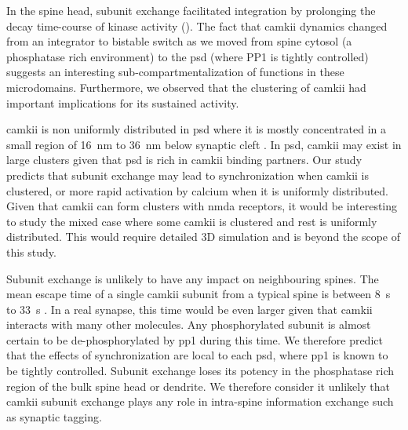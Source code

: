 \documentclass[9pt,lineno,doublespacing]{elife}
\begin{document}
In the spine head, subunit exchange facilitated integration by prolonging the
decay time-course of kinase activity ().  The
fact that \gls{camkii} dynamics changed from an integrator to bistable switch as
we moved from spine cytosol (a phosphatase rich environment) to the \gls{psd}
(where PP1 is tightly controlled) suggests an interesting
sub-compartmentalization of functions in these microdomains. Furthermore, we
observed that the clustering of \gls{camkii} had important implications for its
sustained activity.

\Gls{camkii} is non uniformly distributed in \gls{psd} where it is mostly
concentrated in a small region of \SI{16}{\nano \meter} to \SI{36}{\nano \meter}
below synaptic cleft \citep{petersen_distribution_2003}. In \gls{psd}, \gls{camkii} may exist in
large clusters given that \gls{psd} is rich in \gls{camkii} binding partners.
Our study predicts that subunit exchange may lead to synchronization when
\gls{camkii} is clustered, or more rapid activation by calcium when it is uniformly
distributed. Given that \gls{camkii} can form clusters with \gls{nmda}
receptors, it would be interesting to study the mixed case where some
\gls{camkii} is clustered and rest is uniformly distributed. This would require
detailed 3D simulation and is beyond the scope of this study.

Subunit exchange is unlikely to have any impact on neighbouring spines. The mean
escape time of a single \gls{camkii} subunit from a typical spine is between
\SI{8}{\second} to \SI{33}{\second} \citep{holcman_diffusion_2011}. In a real
synapse, this time would be even larger given that \gls{camkii} interacts with
many other molecules. Any phosphorylated subunit is almost certain to be
de-phosphorylated by \gls{pp1} during this time. We therefore predict that the
effects of synchronization are local to each \gls{psd}, where \gls{pp1} is known
to be tightly controlled.  Subunit exchange loses its potency in the phosphatase
rich region of the bulk spine head or dendrite. We therefore consider it
unlikely that \gls{camkii} subunit exchange plays any role in intra-spine
information exchange such as synaptic tagging.
\end{document}
